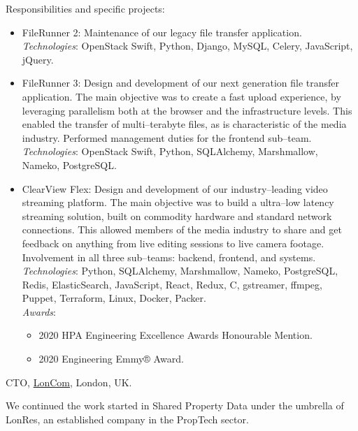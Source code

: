 \documentclass[11pt]{article}
\newcommand{\years}[1]{\marginnote{\scriptsize #1}}
\begin{document}
Responsibilities and specific projects:
\begin{itemize}
	\item  FileRunner 2: Maintenance of our legacy file transfer application.\\
	\textit{Technologies}: OpenStack Swift, Python, Django, MySQL, Celery, JavaScript, jQuery.
	\item  FileRunner 3: Design and development of our next generation file transfer application. The main objective was to create a fast upload experience, by leveraging parallelism both at the browser and the infrastructure levels. This enabled the transfer of multi--terabyte files, as is characteristic of the media industry. Performed management duties for the frontend sub--team.\\
	\textit{Technologies}: OpenStack Swift, Python, SQLAlchemy, Marshmallow, Nameko, PostgreSQL.
	\item  {ClearView Flex}: Design and development of our industry--leading video streaming platform. The main objective was to build a ultra--low latency streaming solution, built on commodity hardware and standard network connections. This allowed members of the media industry to share and get feedback on anything from live editing sessions to live camera footage. Involvement in all three sub--teams: backend, frontend, and systems.\\
	\textit{Technologies}: Python, SQLAlchemy, Marshmallow, Nameko, PostgreSQL, Redis, ElasticSearch, JavaScript, React, Redux, C, gstreamer, ffmpeg, Puppet, Terraform, Linux, Docker, Packer.\\
	\textit{Awards}:
	\begin{itemize}
		\item 2020 HPA Engineering Excellence Awards Honourable Mention.
		\item 2020 Engineering Emmy® Award.
	\end{itemize}
\end{itemize}

\years{2017--2018}\textsc{CTO}, \href{http://loncom.com}{LonCom}, London, UK.

We continued the work started in Shared Property Data under the umbrella of LonRes, an established company in the PropTech sector.
\end{document}
